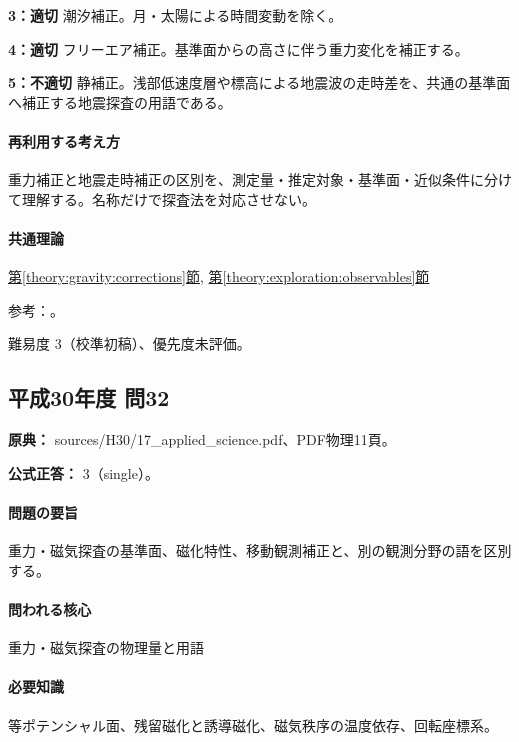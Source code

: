\noindent\textbf{3：適切} 潮汐補正。月・太陽による時間変動を除く。\par

\noindent\textbf{4：適切} フリーエア補正。基準面からの高さに伴う重力変化を補正する。\par

\noindent\textbf{5：不適切} 静補正。浅部低速度層や標高による地震波の走時差を、共通の基準面へ補正する地震探査の用語である。\par

\paragraph{再利用する考え方} 重力補正と地震走時補正の区別を、測定量・推定対象・基準面・近似条件に分けて理解する。名称だけで探査法を対応させない。

\paragraph{共通理論} \hyperref[theory:gravity:corrections]{第\ref*{theory:gravity:corrections}節}, \hyperref[theory:exploration:observables]{第\ref*{theory:exploration:observables}節}

\par 参考：\cite{gsi_gravity_definitions}。

\par 難易度 3（校準初稿）、優先度未評価。

\subsection{平成30年度 問32}
\label{q:h30-reg-applied-32}

\noindent\textbf{原典：} sources/H30/17\_applied\_science.pdf、PDF物理11頁。

\textbf{公式正答：} 3（single）。

\paragraph{問題の要旨} 重力・磁気探査の基準面、磁化特性、移動観測補正と、別の観測分野の語を区別する。

\paragraph{問われる核心} 重力・磁気探査の物理量と用語

\paragraph{必要知識} 等ポテンシャル面、残留磁化と誘導磁化、磁気秩序の温度依存、回転座標系。

